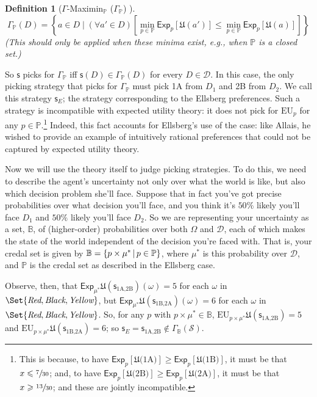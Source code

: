 \documentclass[a4paper]{article}
\newtheorem{definition}{Definition}
\newcommand\D{\mathcal{D}}
\renewcommand\S{\mathcal{S}}
\newcommand\s{\mathsf{s}}
\renewcommand\P{\mathbb{P}} %
\newcommand\Exp{\mathsf{Exp}}
\newcommand\EU{\mathrm{EU}}
\newcommand\U{\mathfrak{U}} %
\newcommand\Maximin{\Gamma}
\newcommand{\IB}{\mathbb{B}}
\newcommand{\IP}{\P}
\newcommand\SetDelimiter[1][]{
	\nonscript\,#1\vert \allowbreak \nonscript\,\mathopen{}}
\providecommand\given{\SetDelimiter}
\renewcommand{\leq}{\leqslant}
\renewcommand{\geq}{\geqslant}
\newenvironment{CCM rewritten}
{\begingroup\color{blue}} %
{\endgroup}              %
\begin{document}
\begin{definition}[$\Gamma$-Maximin$_\IP$ ($\Maximin_\IP$) ]
$$
\Maximin_\IP(D) = \left \{ a \in D \mid (\forall a' \in D)\left [\min_{p \in \IP} \Exp_p[\U(a')] \leq \min_{p \in \IP} \Exp_p[\U(a)] \right ] \right \}
$$
(This should only be applied when these minima exist, e.g., when $\IP$ is a closed set.)
\end{definition}

So $\s$ picks for $\Maximin_\IP$ iff $\s(D)\in\Maximin_\IP(D)$ for every $D\in\D$. In this case, the only picking strategy that picks for $\Maximin_\IP$ must pick 1A from $D_1$ and 2B from $D_2$. We call this strategy $\s_E$; the strategy corresponding to the Ellsberg preferences. Such a strategy is incompatible with expected utility theory: it does not pick for $\EU_p$ for any $p\in\IP$.\footnote{\label{ftnte:Ellsberg not EU}This is because, to have $\Exp_p[\U(\text{1A)}]\geq \Exp_p[\U(\text{1B)}]$, it must be that $x\leq \sfrac{7}{30}$; and, to have  $\Exp_p[\U(\text{2B)}]\geq \Exp_p[\U(\text{2A)}]$, it must be that $x\geq \sfrac{13}{30}$; and these are jointly incompatible. } Indeed, this fact accounts for Ellsberg's use of the case: like Allais, he wished to provide an example of intuitively rational preferences that could not be captured by expected utility theory. 

Now we will use the theory itself to judge picking strategies. To do this, we need to describe the agent's uncertainty not only over what the world is like, but also which decision problem she'll face. 
Suppose that in fact you've got precise probabilities over what decision you'll face, and you think it's $50\%$ likely you'll face $D_1$ and $50\%$ likely you'll face $D_2$. 
So we are representing your uncertainty as a set, $\IB$, of (higher-order) probabilities over both $\Omega$ and $\D$, each of which makes the state of the world independent of the decision you're faced with. 
{That is, your credal set is given by $\IB=\{p\times\mu^* \given p\in\IP\}$, where $\mu^*$ is this probability over $\D$, and $\IP$ is the credal set as described in the Ellsberg case.}

Observe, then, that $\Exp_{\mu^*}\U(\s_{\text{1A,2B}})(\omega)=5$ for each $\omega$ in $\Set{\textit{Red}, \textit{Black}, \textit{Yellow}}$, but $\Exp_{\mu^*}\U(\s_{\text{1B,2A}})(\omega)=6$ for each $\omega$ in $\Set{\textit{Red}, \textit{Black}, \textit{Yellow}}$. So, for any $p$ with $p\times \mu^*\in \IB$,  $\EU_{p\times\mu^*}\U(\s_{\text{1A,2B}})=5$ and  $\EU_{p\times\mu^*}\U(\s_{\text{1B,2A}})=6$; so $\s_E=\s_{\text{1A,2B}}\notin\Maximin_{\IB}(\S)$. 
\end{document}
